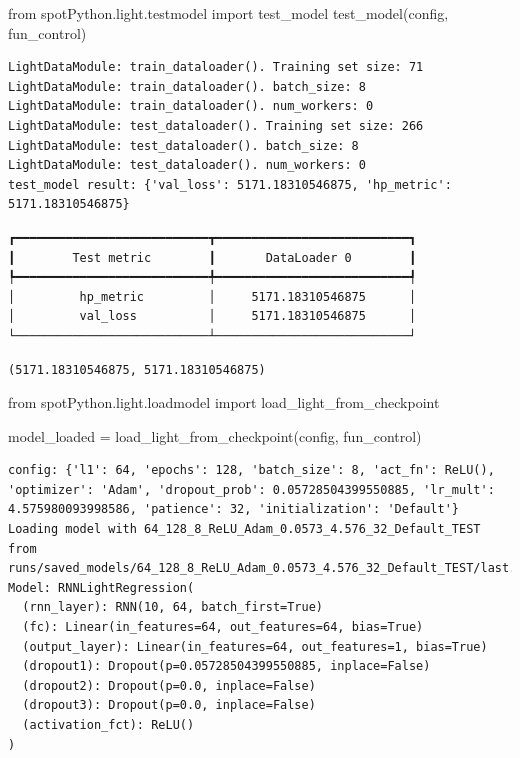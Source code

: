\documentclass[
  letterpaper,
  DIV=11,
  numbers=noendperiod]{scrreprt}
\newenvironment{Shaded}{\begin{snugshade}}{\end{snugshade}}
\newcommand{\ImportTok}[1]{\textcolor[rgb]{0.00,0.46,0.62}{#1}}
\newcommand{\NormalTok}[1]{\textcolor[rgb]{0.00,0.23,0.31}{#1}}
\newcommand{\OperatorTok}[1]{\textcolor[rgb]{0.37,0.37,0.37}{#1}}
\begin{document}
\begin{Shaded}
\begin{Highlighting}[]
\ImportTok{from}\NormalTok{ spotPython.light.testmodel }\ImportTok{import}\NormalTok{ test\_model}
\NormalTok{test\_model(config, fun\_control)}
\end{Highlighting}
\end{Shaded}

\begin{verbatim}
LightDataModule: train_dataloader(). Training set size: 71
LightDataModule: train_dataloader(). batch_size: 8
LightDataModule: train_dataloader(). num_workers: 0
LightDataModule: test_dataloader(). Training set size: 266
LightDataModule: test_dataloader(). batch_size: 8
LightDataModule: test_dataloader(). num_workers: 0
test_model result: {'val_loss': 5171.18310546875, 'hp_metric': 5171.18310546875}
\end{verbatim}

\begin{verbatim}
┏━━━━━━━━━━━━━━━━━━━━━━━━━━━┳━━━━━━━━━━━━━━━━━━━━━━━━━━━┓
┃        Test metric        ┃       DataLoader 0        ┃
┡━━━━━━━━━━━━━━━━━━━━━━━━━━━╇━━━━━━━━━━━━━━━━━━━━━━━━━━━┩
│         hp_metric         │     5171.18310546875      │
│         val_loss          │     5171.18310546875      │
└───────────────────────────┴───────────────────────────┘
\end{verbatim}

\begin{verbatim}
(5171.18310546875, 5171.18310546875)
\end{verbatim}

\begin{Shaded}
\begin{Highlighting}[]
\ImportTok{from}\NormalTok{ spotPython.light.loadmodel }\ImportTok{import}\NormalTok{ load\_light\_from\_checkpoint}

\NormalTok{model\_loaded }\OperatorTok{=}\NormalTok{ load\_light\_from\_checkpoint(config, fun\_control)}
\end{Highlighting}
\end{Shaded}

\begin{verbatim}
config: {'l1': 64, 'epochs': 128, 'batch_size': 8, 'act_fn': ReLU(), 'optimizer': 'Adam', 'dropout_prob': 0.05728504399550885, 'lr_mult': 4.575980093998586, 'patience': 32, 'initialization': 'Default'}
Loading model with 64_128_8_ReLU_Adam_0.0573_4.576_32_Default_TEST from runs/saved_models/64_128_8_ReLU_Adam_0.0573_4.576_32_Default_TEST/last.ckpt
Model: RNNLightRegression(
  (rnn_layer): RNN(10, 64, batch_first=True)
  (fc): Linear(in_features=64, out_features=64, bias=True)
  (output_layer): Linear(in_features=64, out_features=1, bias=True)
  (dropout1): Dropout(p=0.05728504399550885, inplace=False)
  (dropout2): Dropout(p=0.0, inplace=False)
  (dropout3): Dropout(p=0.0, inplace=False)
  (activation_fct): ReLU()
)
\end{verbatim}
\end{document}
